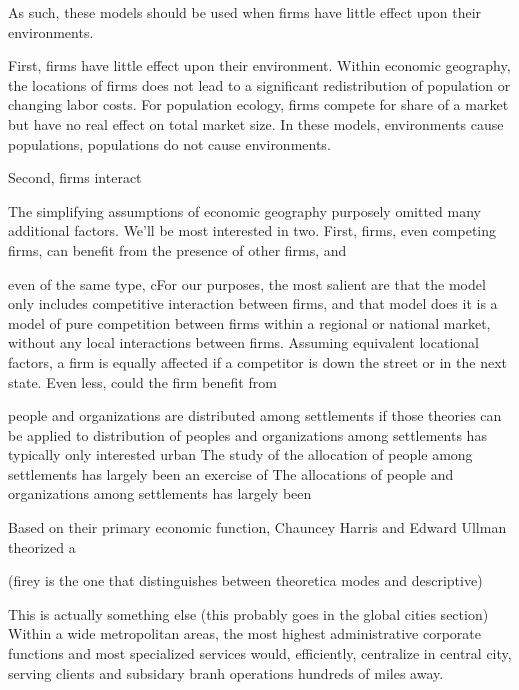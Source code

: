 




As such, these models should be used when
firms have little effect upon their environments. 

First, firms have little effect upon their environment. Within
economic geography, the locations of firms does not lead to a
significant redistribution of population or changing labor costs. For
population ecology, firms compete for share of a market but have no
real effect on total market size. In these models, environments cause
populations, populations do not cause environments.

Second, firms interact 



The simplifying assumptions of economic geography purposely omitted
many additional factors. We'll be most interested in two. First, firms,
even competing firms, can benefit from the presence of other firms,
and  


even of the same type, cFor our purposes, the most salient are that
the model only includes competitive interaction between firms, and
that model does 
it is a model of pure competition between firms within a regional or
national market, without any local interactions between
firms. Assuming equivalent locational factors, a firm is equally
affected if a competitor is down the street or in the next state. Even
less, could the firm benefit from 




people and organizations are distributed among settlements if
those theories can be applied to 
distribution of peoples and organizations among settlements has
typically only interested urban 
The study of the allocation of people among settlements has largely
been an exercise of 
The allocations of people and organizations among settlements has
largely been


Based on their primary economic function, Chauncey Harris and Edward
Ullman theorized a


(firey is the one that distinguishes between theoretica modes and
descriptive)



This is actually something else (this probably goes in the global
cities section)
Within a wide
metropolitan areas, the most highest administrative corporate
functions and most specialized services would, efficiently, centralize
in central city, serving clients and subsidary branh operations
hundreds of miles away.







